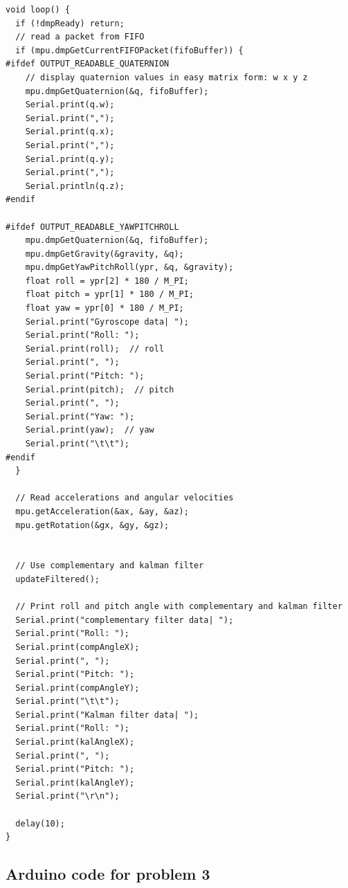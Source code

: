 \documentclass[conference]{IEEEtran}
\begin{document}
\begin{lstlisting}[style=Arduino]
void loop() {
  if (!dmpReady) return;
  // read a packet from FIFO
  if (mpu.dmpGetCurrentFIFOPacket(fifoBuffer)) {
#ifdef OUTPUT_READABLE_QUATERNION
    // display quaternion values in easy matrix form: w x y z
    mpu.dmpGetQuaternion(&q, fifoBuffer);
    Serial.print(q.w);
    Serial.print(",");
    Serial.print(q.x);
    Serial.print(",");
    Serial.print(q.y);
    Serial.print(",");
    Serial.println(q.z);
#endif

#ifdef OUTPUT_READABLE_YAWPITCHROLL
    mpu.dmpGetQuaternion(&q, fifoBuffer);
    mpu.dmpGetGravity(&gravity, &q);
    mpu.dmpGetYawPitchRoll(ypr, &q, &gravity);
    float roll = ypr[2] * 180 / M_PI;
    float pitch = ypr[1] * 180 / M_PI;
    float yaw = ypr[0] * 180 / M_PI;
    Serial.print("Gyroscope data| ");
    Serial.print("Roll: ");
    Serial.print(roll);  // roll
    Serial.print(", ");
    Serial.print("Pitch: ");
    Serial.print(pitch);  // pitch
    Serial.print(", ");
    Serial.print("Yaw: ");
    Serial.print(yaw);  // yaw
    Serial.print("\t\t");
#endif
  }

  // Read accelerations and angular velocities
  mpu.getAcceleration(&ax, &ay, &az);
  mpu.getRotation(&gx, &gy, &gz);


  // Use complementary and kalman filter
  updateFiltered();

  // Print roll and pitch angle with complementary and kalman filter
  Serial.print("complementary filter data| ");
  Serial.print("Roll: ");
  Serial.print(compAngleX);
  Serial.print(", ");
  Serial.print("Pitch: ");
  Serial.print(compAngleY);
  Serial.print("\t\t");
  Serial.print("Kalman filter data| ");
  Serial.print("Roll: ");
  Serial.print(kalAngleX);
  Serial.print(", ");
  Serial.print("Pitch: ");
  Serial.print(kalAngleY);
  Serial.print("\r\n");

  delay(10);
}

\end{lstlisting}

\subsection{Arduino code for problem 3}
\end{document}
